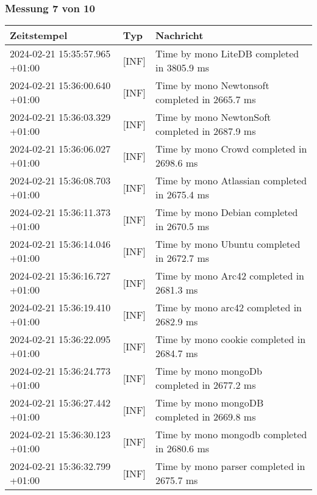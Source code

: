     \subsubsection*{Messung 7 von 10} \label{subsubsec:LiteDbMehrPaketeAlsDb7von10}
        {
            {\small
                \begin{tabularx}{\textwidth}{|l|l|X|}
                    \hline
                    \textbf{Zeitstempel} & \textbf{Typ} & \textbf{Nachricht} \\
                    \hline
                    \endhead
                    2024-02-21 15:35:57.965 +01:00 & [INF] & Time by mono LiteDB completed in 3805.9 ms \\
                    2024-02-21 15:36:00.640 +01:00 & [INF] & Time by mono Newtonsoft completed in 2665.7 ms \\
                    2024-02-21 15:36:03.329 +01:00 & [INF] & Time by mono NewtonSoft completed in 2687.9 ms \\
                    2024-02-21 15:36:06.027 +01:00 & [INF] & Time by mono Crowd completed in 2698.6 ms \\
                    2024-02-21 15:36:08.703 +01:00 & [INF] & Time by mono Atlassian completed in 2675.4 ms \\
                    2024-02-21 15:36:11.373 +01:00 & [INF] & Time by mono Debian completed in 2670.5 ms \\
                    2024-02-21 15:36:14.046 +01:00 & [INF] & Time by mono Ubuntu completed in 2672.7 ms \\
                    2024-02-21 15:36:16.727 +01:00 & [INF] & Time by mono Arc42 completed in 2681.3 ms \\
                    2024-02-21 15:36:19.410 +01:00 & [INF] & Time by mono arc42 completed in 2682.9 ms \\
                    2024-02-21 15:36:22.095 +01:00 & [INF] & Time by mono cookie completed in 2684.7 ms \\
                    2024-02-21 15:36:24.773 +01:00 & [INF] & Time by mono mongoDb completed in 2677.2 ms \\
                    2024-02-21 15:36:27.442 +01:00 & [INF] & Time by mono mongoDB completed in 2669.8 ms \\
                    2024-02-21 15:36:30.123 +01:00 & [INF] & Time by mono mongodb completed in 2680.6 ms \\
                    2024-02-21 15:36:32.799 +01:00 & [INF] & Time by mono parser completed in 2675.7 ms \\

\end{tabularx}}}
